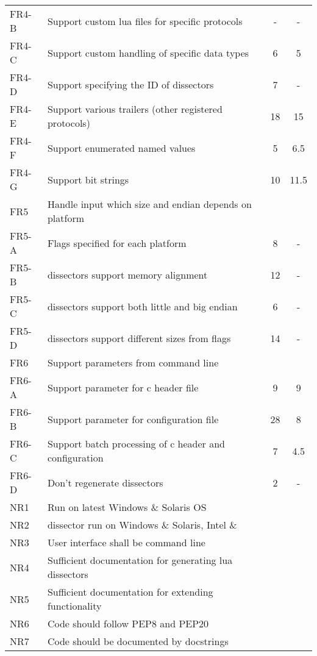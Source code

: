 \begin{table}[ht]
\begin{tabularx}{\textwidth}{l X c c}
	FR4-B & Support custom \Gls{lua} files for specific protocols & - & - \\
	FR4-C & Support custom handling of specific data types & 6 & 5 \\
	FR4-D & Support specifying the ID of \glspl{dissector} & 7 & - \\
	FR4-E & Support various \gls{trailers} (other registered protocols) & 18 & 15 \\
	FR4-F & Support \glspl{enumerated named value}  & 5 & 6.5 \\
	FR4-G & Support bit strings & 10 & 11.5 \\
	\addlinespace
	FR5 & Handle input which size and \gls{endian} depends on platform & & \\
	FR5-A & Flags specified for each platform & 8 & - \\
	FR5-B & \Glspl{dissector} support memory alignment & 12 & - \\
	FR5-C & \Glspl{dissector} support both little and big \gls{endian} & 6 & - \\
	FR5-D & \Glspl{dissector} support different sizes from flags & 14 & - \\	
	\addlinespace
	FR6 & Support parameters from command line & & \\
	FR6-A & Support parameter for \Gls{c} \gls{header} file & 9 & 9 \\
	FR6-B & Support parameter for configuration file & 28 & 8 \\
	FR6-C & Support batch processing of \Gls{c} \gls{header} and configuration & 7 & 4.5 \\
	FR6-D & Don't regenerate \glspl{dissector} & 2 & - \\
	\addlinespace
	NR1 & Run on latest \Gls{Windows} \& \Gls{Solaris} OS & & \\
	NR2 & \Gls{dissector} run on \Gls{Windows} \& \Gls{Solaris}, Intel \& \GLS{sparc} & & \\
	NR3 & User interface shall be command line & & \\
	NR4 & Sufficient documentation for generating \Gls{lua} \glspl{dissector} & & \\
	NR5 & Sufficient documentation for extending functionality & & \\
	NR6 & Code should follow PEP8 and PEP20 & & \\
	NR7 & Code should be documented by docstrings & & \\
	\bottomrule
\end{tabularx}
\end{table}








